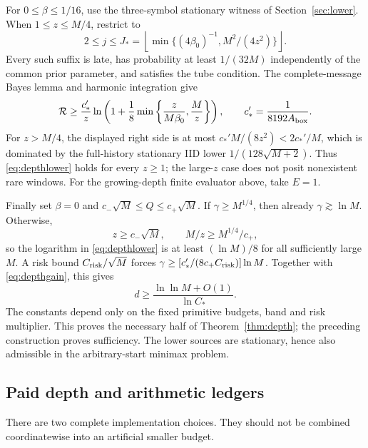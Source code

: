 \documentclass[11pt,letterpaper]{article}
\theoremstyle{definition}\newtheorem{definition}[theorem]{Definition}
\theoremstyle{remark}\newtheorem{remark}[theorem]{Remark}
\newcommand{\floor}[1]{\left\lfloor #1\right\rfloor}
\newcommand{\Risk}{\mathcal{R}}
\begin{document}
For $0\le\beta\le1/16$, use the three-symbol stationary witness of Section~\ref{sec:lower}. When $1\le z\le M/4$, restrict to
\[
 2\le j\le J_*=\floor{\min\{(4\beta_0)^{-1},M^2/(4z^2)\}}.
\]
Every such suffix is late, has probability at least $1/(32M)$ independently of the common prior parameter, and satisfies the tube condition. The complete-message Bayes lemma and harmonic integration give
\begin{equation}\label{eq:depthlower}
 \Risk\ge\frac{c_*'}z
 \ln\left(1+\frac18\min\left\{\frac{z}{M\beta_0},\frac Mz\right\}\right),
 \qquad c_*'=\frac1{8192A_{\rm box}}.
\end{equation}
For $z>M/4$, the displayed right side is at most
$c_*'M/(8z^2)<2c_*'/M$, which is dominated by the full-history stationary IID lower $1/(128\sqrt{M+2})$. Thus \eqref{eq:depthlower} holds for every $z\ge1$; the large-$z$ case does not posit nonexistent rare windows. For the growing-depth finite evaluator above, take $E=1$.

Finally set $\beta=0$ and $c_-\sqrt M\le Q\le c_+\sqrt M$. If $\gamma\ge M^{1/4}$, then already $\gamma\gtrsim\ln M$. Otherwise,
\[
 z\ge c_-\sqrt M,\qquad M/z\ge M^{1/4}/c_+,
\]
so the logarithm in \eqref{eq:depthlower} is at least $(\ln M)/8$ for all sufficiently large $M$. A risk bound $C_{\rm risk}/\sqrt M$ forces
$\gamma\ge[c_*'/(8c_+C_{\rm risk})]\ln M$.
Together with \eqref{eq:depthgain}, this gives
\[
 d\ge\frac{\ln\ln M+O(1)}{\ln C_*}.
\]
The constants depend only on the fixed primitive budgets, band and risk multiplier. This proves the necessary half of Theorem~\ref{thm:depth}; the preceding construction proves sufficiency. The lower sources are stationary, hence also admissible in the arbitrary-start minimax problem.

\subsection{Paid depth and arithmetic ledgers}\label{sec:depthcost}
There are two complete implementation choices. They should not be combined coordinatewise into an artificial smaller budget.
\end{document}

